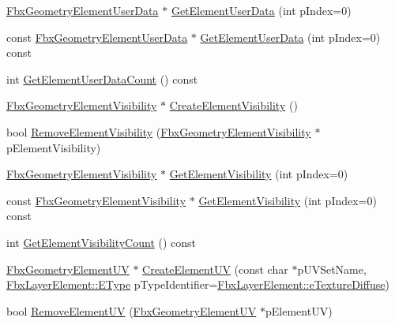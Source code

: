 \begin{DoxyCompactItemize}
\item 
\hyperlink{fbxlayer_8h_acef498b248e323a189b5ccbf478b0b41}{Fbx\+Geometry\+Element\+User\+Data} $\ast$ \hyperlink{class_fbx_geometry_base_aaae41fe6881f55fb722cb9fae88c5bbf}{Get\+Element\+User\+Data} (int p\+Index=0)
\item 
const \hyperlink{fbxlayer_8h_acef498b248e323a189b5ccbf478b0b41}{Fbx\+Geometry\+Element\+User\+Data} $\ast$ \hyperlink{class_fbx_geometry_base_a40c905252aebb1ea71bd4d71a4c8704d}{Get\+Element\+User\+Data} (int p\+Index=0) const
\item 
int \hyperlink{class_fbx_geometry_base_a8ea1964abcfde21f82d576ca07ac7f67}{Get\+Element\+User\+Data\+Count} () const
\item 
\hyperlink{fbxlayer_8h_a98f6c16a3021e9e04b0352f652eac2a1}{Fbx\+Geometry\+Element\+Visibility} $\ast$ \hyperlink{class_fbx_geometry_base_a92af07a2d0739a8e27108838c5c7eac4}{Create\+Element\+Visibility} ()
\item 
bool \hyperlink{class_fbx_geometry_base_a5265ada1a14bc10a5be69719547827b5}{Remove\+Element\+Visibility} (\hyperlink{fbxlayer_8h_a98f6c16a3021e9e04b0352f652eac2a1}{Fbx\+Geometry\+Element\+Visibility} $\ast$p\+Element\+Visibility)
\item 
\hyperlink{fbxlayer_8h_a98f6c16a3021e9e04b0352f652eac2a1}{Fbx\+Geometry\+Element\+Visibility} $\ast$ \hyperlink{class_fbx_geometry_base_ad4efa742959f1ff9db49f67cebcc5779}{Get\+Element\+Visibility} (int p\+Index=0)
\item 
const \hyperlink{fbxlayer_8h_a98f6c16a3021e9e04b0352f652eac2a1}{Fbx\+Geometry\+Element\+Visibility} $\ast$ \hyperlink{class_fbx_geometry_base_a7354e0200f75665cbc4f3137cac53046}{Get\+Element\+Visibility} (int p\+Index=0) const
\item 
int \hyperlink{class_fbx_geometry_base_a9f41f006fb1545c11e1a06c80312cda9}{Get\+Element\+Visibility\+Count} () const
\item 
\hyperlink{fbxlayer_8h_a12413531f4bb2c482e3ddbd59e3417e5}{Fbx\+Geometry\+Element\+UV} $\ast$ \hyperlink{class_fbx_geometry_base_ac2d647f718a69776037377e79dfc8c3e}{Create\+Element\+UV} (const char $\ast$p\+U\+V\+Set\+Name, \hyperlink{class_fbx_layer_element_a8c95c5cd880b56c776acd379bd86f42c}{Fbx\+Layer\+Element\+::\+E\+Type} p\+Type\+Identifier=\hyperlink{class_fbx_layer_element_a8c95c5cd880b56c776acd379bd86f42ca09829e6ecf512e7ae04d9ad8de1342fa}{Fbx\+Layer\+Element\+::e\+Texture\+Diffuse})
\item 
bool \hyperlink{class_fbx_geometry_base_a0f571119663cc96a58d42e0e555a9be6}{Remove\+Element\+UV} (\hyperlink{fbxlayer_8h_a12413531f4bb2c482e3ddbd59e3417e5}{Fbx\+Geometry\+Element\+UV} $\ast$p\+Element\+UV)

\end{DoxyCompactItemize}
